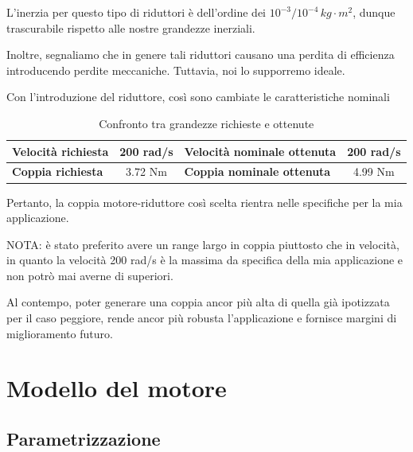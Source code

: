 \documentclass[a4paper,12pt]{article}
\begin{document}
L'inerzia per questo tipo di riduttori è dell'ordine dei $10^{-3}/10^{-4}\,kg \cdot m^2$, dunque trascurabile rispetto alle nostre grandezze inerziali.

\vspace{0.5cm}

Inoltre, segnaliamo che in genere tali riduttori causano una perdita di efficienza introducendo perdite meccaniche. Tuttavia, noi lo supporremo ideale.

\vspace{0.5cm}
Con l'introduzione del riduttore, così sono cambiate le caratteristiche nominali 

\begin{table}[h!]
    \centering
    \begin{tabular}{|l|c|l|c|}
    \hline
    \textbf{Velocità richiesta} & 200 rad/s & \textbf{Velocità nominale ottenuta} & 200 rad/s \\ \hline
    \textbf{Coppia richiesta}  &  3.72 Nm  & \textbf{Coppia nominale ottenuta}   & 4.99 Nm              \\ \hline
    \end{tabular}
    \caption{Confronto tra grandezze richieste e ottenute}
\end{table}

\vspace{0.3cm}

Pertanto, la coppia motore-riduttore così scelta rientra nelle specifiche per la mia applicazione.

\vspace{0.5cm}

NOTA: è stato preferito avere un range largo in coppia piuttosto che in velocità, in quanto la velocità 200 rad/s è la massima da specifica della mia applicazione e non potrò mai averne di superiori.

Al contempo, poter generare una coppia ancor più alta di quella già ipotizzata per il caso peggiore, rende ancor più robusta l'applicazione e fornisce margini di miglioramento futuro.

\newpage



\section{Modello del motore}

\subsection{Parametrizzazione}
\end{document}
